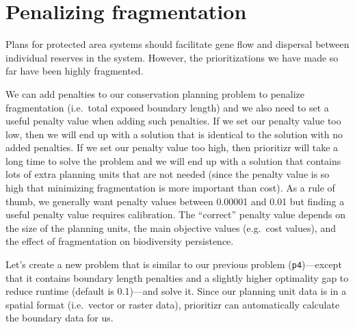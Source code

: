 \documentclass[
  12pt,
]{book}
\begin{document}
\hypertarget{penalizing-fragmentation}{%
\section{Penalizing fragmentation}\label{penalizing-fragmentation}}

Plans for protected area systems should facilitate gene flow and dispersal between individual reserves in the system. However, the prioritizations we have made so far have been highly fragmented.

We can add penalties to our conservation planning problem to penalize fragmentation (i.e.~total exposed boundary length) and we also need to set a useful penalty value when adding such penalties. If we set our penalty value too low, then we will end up with a solution that is identical to the solution with no added penalties. If we set our penalty value too high, then prioritizr will take a long time to solve the problem and we will end up with a solution that contains lots of extra planning units that are not needed (since the penalty value is so high that minimizing fragmentation is more important than cost). As a rule of thumb, we generally want penalty values between 0.00001 and 0.01 but finding a useful penalty value requires calibration. The ``correct'' penalty value depends on the size of the planning units, the main objective values (e.g.~cost values), and the effect of fragmentation on biodiversity persistence.

Let's create a new problem that is similar to our previous problem (\texttt{p4})---except that it contains boundary length penalties and a slightly higher optimality gap to reduce runtime (default is 0.1)---and solve it. Since our planning unit data is in a spatial format (i.e.~vector or raster data), prioritizr can automatically calculate the boundary data for us.

\clearpage
\end{document}
